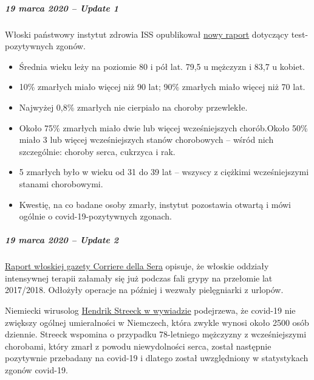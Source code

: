 \hypertarget{19-marca-2020--update-1}{%
\subparagraph{\texorpdfstring{\textbf{19 marca 2020 -- Update
1}}{19 marca 2020 -- Update 1}}\label{19-marca-2020--update-1}}

Włoski państwowy instytut zdrowia ISS opublikował
\href{https://www.epicentro.iss.it/coronavirus/bollettino/Report-COVID-2019_17_marzo-v2.pdf}{nowy
raport} dotyczący test-pozytywnych zgonów.

\begin{itemize}
\tightlist
\item
  Średnia wieku leży na poziomie 80 i pół lat. 79,5 u mężczyzn i 83,7 u
  kobiet.
\item
  10\% zmarłych miało więcej niż 90 lat; 90\% zmarłych miało więcej niż
  70 lat.
\item
  Najwyżej 0,8\% zmarłych nie cierpiało na choroby przewlekłe.
\item
  Około 75\% zmarłych miało dwie lub więcej wcześniejszych chorób.Około
  50\% miało 3 lub więcej wcześniejszych stanów chorobowych -- wśród
  nich szczególnie: choroby serca, cukrzyca i rak.
\item
  5 zmarłych było w wieku od 31 do 39 lat -- wszyscy z ciężkimi
  wcześniejszymi stanami chorobowymi.
\item
  Kwestię, na co badane osoby zmarły, instytut pozostawia otwartą i mówi
  ogólnie o covid-19-pozytywnych zgonach.
\end{itemize}

\hypertarget{19-marca-2020--update-2}{%
\subparagraph{\texorpdfstring{\textbf{19 marca 2020 -- Update
2}}{19 marca 2020 -- Update 2}}\label{19-marca-2020--update-2}}

\href{https://milano.corriere.it/notizie/cronaca/18_gennaio_10/milano-terapie-intensive-collasso-l-influenza-gia-48-malati-gravi-molte-operazioni-rinviate-c9dc43a6-f5d1-11e7-9b06-fe054c3be5b2.shtml}{Raport
włoskiej gazety Corriere della Sera} opisuje, że włoskie oddziały
intensywnej terapii załamały się już podczas fali grypy na przełomie lat
2017/2018. Odłożyły operacje na później i wezwały pielęgniarki z
urlopów.

Niemiecki wirusolog
\href{https://www.faz.net/aktuell/gesellschaft/gesundheit/coronavirus/virologe-hendrik-streeck-ueber-corona-neue-symptome-entdeckt-16681450.html?printPagedArticle=true\#pageIndex_2}{Hendrik
Streeck w wywiadzie} podejrzewa, że covid-19 nie zwiększy ogólnej
umieralności w Niemczech, która zwykle wynosi około 2500 osób dziennie.
Streeck wspomina o przypadku 78-letniego mężczyzny z wcześniejszymi
chorobami, który zmarł z powodu niewydolności serca, został następnie
pozytywnie przebadany na covid-19 i dlatego został uwzględniony w
statystykach zgonów covid-19.

